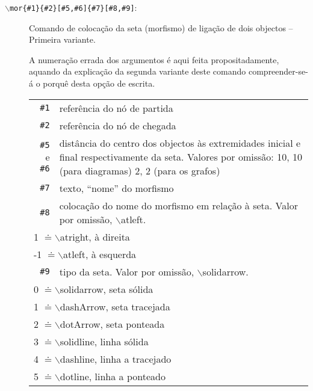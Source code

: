 \documentclass[a4paper,11pt]{article}
\begin{document}
\begin{description}
\item[{\tt $\backslash$mor\{\#1\}\{\#2\}[\#5,\#6]\{\#7\}[\#8,\#9]}:]
  Comando de colocação da seta (morfismo) de ligação de dois objectos
  -- Primeira variante.

  A numeração errada dos argumentos é aqui feita propositadamente,
  aquando da explicação da segunda variante deste comando
  compreender-se-á o porquê desta opção de escrita.

  \begin{longtable}{r@{ -- }p{32em}}
    {\tt \#1} & referência do nó de partida\\
    {\tt \#2} & referência do nó de chegada\\
    {\tt \#5} e  {\tt \#6} & distância do centro dos objectos às
    extremidades inicial e final respectivamente da seta. Valores por
    omissão: 10, 10 (para diagramas) 2, 2 (para os grafos)\\
    {\tt \#7} & texto, ``nome'' do morfismo\\
    {\tt \#8} & colocação do nome do morfismo em relação à seta. Valor
    por omissão, $\backslash$atleft. \\
    \multicolumn{2}{l}{\hspace*{4.5em} 1 $\doteq\backslash$atright, à direita}\\ 
    \multicolumn{2}{l}{\hspace*{4.5em} -1 $\doteq\backslash$atleft, à esquerda}\\
    {\tt \#9} & tipo da seta. Valor por omissão, $\backslash$solidarrow.\\
    \multicolumn{2}{l}{\hspace*{4.5em} 0 $\doteq\backslash$solidarrow, seta sólida} \\
    \multicolumn{2}{l}{\hspace*{4.5em} 1 $\doteq\backslash$dashArrow, seta tracejada} \\
    \multicolumn{2}{l}{\hspace*{4.5em} 2 $\doteq\backslash$dotArrow, seta ponteada} \\
    \multicolumn{2}{l}{\hspace*{4.5em} 3 $\doteq\backslash$solidline, linha sólida} \\
    \multicolumn{2}{l}{\hspace*{4.5em} 4 $\doteq\backslash$dashline, linha a tracejado} \\
    \multicolumn{2}{l}{\hspace*{4.5em} 5 $\doteq\backslash$dotline, linha a ponteado} \\

\end{longtable}
\end{description}
\end{document}
